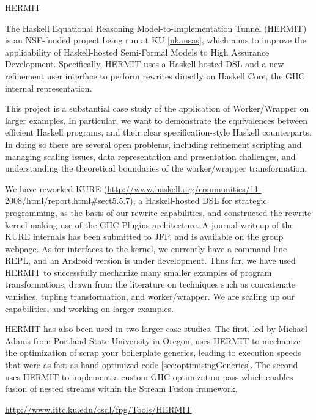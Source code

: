\begin{hcarentry}[updated]{HERMIT}
\label{HERMIT}
\makeheader

The Haskell Equational Reasoning Model-to-Implementation Tunnel
(HERMIT) is an NSF-funded project being run at KU \cref{ukansas}, which aims to improve the
applicability of Haskell-hosted Semi-Formal Models to High Assurance Development.
Specifically, HERMIT uses a Haskell-hosted DSL
and a new refinement user interface to perform rewrites directly on Haskell Core, the GHC internal representation.

This project is a substantial case study of the application of
Worker/Wrapper on larger examples. In particular, we want to
demonstrate the equivalences between efficient Haskell programs, and
their clear specification-style Haskell counterparts. In doing so
there are several open problems, including refinement scripting and
managing scaling issues, data representation and presentation
challenges, and understanding the theoretical boundaries of the
worker/wrapper transformation.

We have reworked KURE (\url{http://www.haskell.org/communities/11-2008/html/report.html#sect5.5.7}),
a Haskell-hosted DSL for strategic programming, as the basis of our rewrite capabilities,
and constructed the rewrite kernel making use of the GHC Plugins architecture.
A journal writeup of the KURE internals has been submitted to JFP, and is available
on the group webpage.
As for interfaces to the kernel,
we currently have a command-line REPL, and an Android version is under development.
Thus far, we have used HERMIT to successfully mechanize many smaller examples of program transformations,
drawn from the literature on techniques such as concatenate vanishes, tupling transformation, and worker/wrapper.
We are scaling up our capabilities, and working on larger examples.

HERMIT has also been used in two larger case studies.
The first, led by Michael Adams from Portland State University
in Oregon, uses HERMIT to mechanize the optimization of scrap your boilerplate generics,
leading to execution speeds that were as fast as hand-optimized code \cref{sec:optimisingGenerics}.
The second uses HERMIT to implement a custom GHC optimization pass which enables fusion of nested streams within the Stream Fusion framework.

\FurtherReading
  \url{http://www.ittc.ku.edu/csdl/fpg/Tools/HERMIT}
\end{hcarentry}
